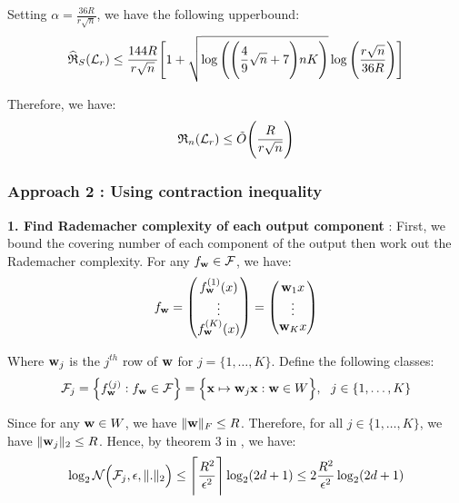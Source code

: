 \noindent Setting $\alpha = \frac{36R}{r\sqrt n}$, we have the following upperbound:
\begin{align*}
    \widehat{\mathfrak{R}}_S(\mathcal{L}_r) \le \frac{144R}{r\sqrt{n}}\Bigg[ 1 + \sqrt{
        \log\Bigg( \Bigg( 
            \frac{4}{9}\sqrt{n} + 7
         \Bigg)nK \Bigg)
    }\log\Bigg( \frac{r\sqrt n}{36R} \Bigg) \Bigg]
\end{align*}

\noindent Therefore, we have:
\begin{align*}
    \mathfrak{R}_n(\mathcal{L}_r) \le \tilde O\Bigg( \frac{R}{r\sqrt{n}} \Bigg)
\end{align*}

\subsubsection{Approach 2 : Using contraction inequality}
\noindent\textbf{1. Find Rademacher complexity of each output component} : First, we bound the covering number of each component of the output then work out the Rademacher complexity.\newline
\noindent For any $f_{\bf w}\in\mathcal{F}$, we have:
\begin{align*}
    f_{\bf w} = \begin{pmatrix}
        f_{\bf w}^{(1)}(x) \\
        \vdots \\
        f_{\bf w}^{(K)}(x)
    \end{pmatrix}
    = 
    \begin{pmatrix}
        {\bf w}_{1}x \\
        \vdots \\
        {\bf w}_{K}x
    \end{pmatrix}
\end{align*}

\noindent Where ${\bf w}_j$ is the $j^{th}$ row of ${\bf w}$ for $j=\{1, \dots, K\}$. Define the following classes:
\begin{align*}
    \F_j = \bigCurl{f_\vecbf{w}^{(j)} : f_\vecbf{w} \in \F} = \bigCurl{\vecbf{x} \mapsto \vecbf{w}_j\vecbf{x} : \vecbf{w} \in W}, \ \ j \in \{1, \dots, K\}
\end{align*}

\noindent\newline Since for any ${\bf w}\in W$, we have $\|{\bf w}\|_F\le R$. Therefore, for all $j\in\{1, \dots, K\}$, we have $\|{\bf w}_j\|_2\le R$. Hence, by theorem 3 in \cite{article:tong_zhang}, we have:
\begin{align*}
    \log_2\mathcal{N}\Big( \mathcal{F}_j, \epsilon, \|.\|_2 \Big) \le \Bigg\lceil \frac{R^2}{\epsilon^2} \Bigg\rceil \log_2(2d+1) \le 2\frac{R^2}{\epsilon^2}\log_2(2d+1)
\end{align*}


